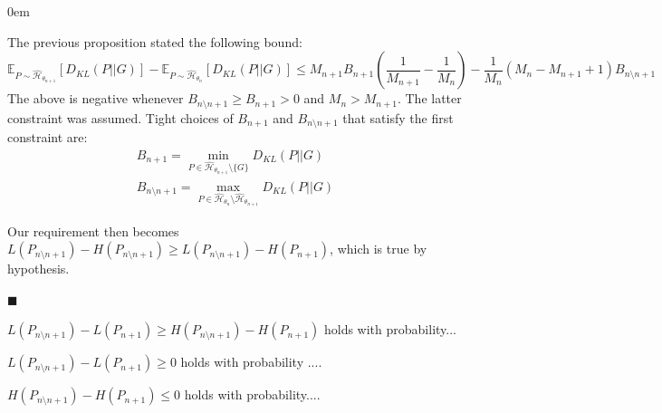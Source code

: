\documentclass[12pt]{article}
\renewcommand{\qed}{\hfill$\blacksquare$}
\renewenvironment{proof}{\begin{addmargin}[1em]{0em}\begin{newproof}}{\end{newproof}\end{addmargin}\qed}
\newenvironment{proposition}[2][Proposition]{\begin{trivlist}
\item[\hskip \labelsep {\bfseries #1}\hskip \labelsep {\bfseries #2.}]}{\end{trivlist}}
\begin{document}
\begin{proof}
    The previous proposition stated the following bound:
    \begin{equation*}
        \mathds{E}_{P\sim \hat{\mathcal{H}}_{\theta_{n+1}}}[D_{KL}(P || G)] - \mathds{E}_{P\sim \hat{\mathcal{H}}_{\theta_n}}[D_{KL}(P || G)] \leq M_{n+1}B_{n+1}(\frac{1}{M_{n+1}} - \frac{1}{M_n}) - \frac{1}{M_n}(M_n - M_{n+1} + 1)B_{n\setminus n+1}
    \end{equation*}
    The above is negative whenever $B_{n\setminus n+1} \geq B_{n+1} > 0$ and $M_n > M_{n+1}$. The latter constraint was assumed. 
    Tight choices of $B_{n+1}$ and $B_{n\setminus n+1}$ that satisfy the first constraint are:
    \begin{gather*}
        B_{n+1} = \min_{P \in \hat{\mathcal{H}}_{\theta_{n+1}} \setminus \{G\}} D_{KL}(P||G) \\
        B_{n\setminus n+1} = \max_{P \in \hat{\mathcal{H}}_{\theta_n} \setminus \hat{\mathcal{H}}_{\theta_{n+1}}} D_{KL}(P||G)
    \end{gather*}

    Our requirement then becomes $L(P_{n\setminus n+1}) - H(P_{n\setminus n+1}) \geq L(P_{n \setminus n+1}) - H(P_{n+1})$, which is true by hypothesis. 
\end{proof}

\begin{proposition}{2}
    $L(P_{n\setminus n+1}) - L(P_{n+1}) \geq H(P_{n\setminus n+1}) - H(P_{n+1})$ holds with probability...

    \item $L(P_{n\setminus n+1}) - L(P_{n+1}) \geq 0$ holds with probability ....

    \item \item $H(P_{n\setminus n+1}) - H(P_{n+1}) \leq 0$ holds with probability....
\end{proposition}
\end{document}
